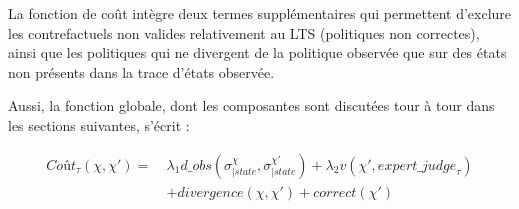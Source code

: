 La fonction de coût intègre deux termes supplémentaires qui permettent d'exclure les contrefactuels non valides relativement au LTS (politiques non correctes), ainsi que les politiques qui ne divergent de la politique observée que sur des états non présents dans la trace d'états observée.

Aussi, la fonction globale, dont les composantes sont discutées tour à tour dans les sections suivantes, s'écrit : 


\begin{equation}\label{cout}
    \begin{split}
        \textit{Coût}_\tau(\chi,\chi')  = \ & \lambda_1  d\_obs(\sigma^\chi_{|state},\sigma^{\chi'}_{|state}) + \lambda_2 v(\chi', expert\_{judge}_\tau) \\
        & + divergence(\chi,\chi') + correct(\chi') 
    \end{split}
\end{equation}

